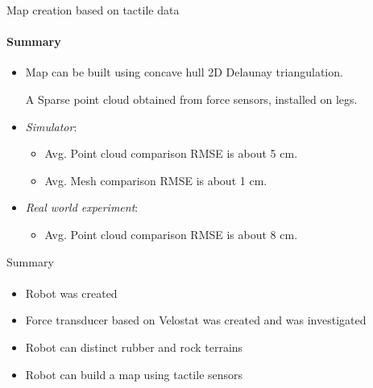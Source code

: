 \documentclass[aspectratio=169]{beamer}
\newcommand{\fbckg}[1]{\usebackgroundtemplate{\texttt{[image: \#1]}}}%
\begin{document}
\begin{frame}[t]{Map creation based on tactile data}
    \framesubtitle{Summary}
    \Large
    \begin{itemize}
        \item Map can be built using concave hull 2D Delaunay triangulation.

              A Sparse point cloud obtained from force sensors, installed on legs.
        \item \textit{Simulator}: \begin{itemize}
                  \item Avg. Point cloud comparison RMSE is about 5 cm.
                  \item Avg. Mesh comparison RMSE is about 1 cm.
              \end{itemize}
        \item \textit{Real world experiment}: \begin{itemize}
                  \item Avg. Point cloud comparison RMSE is about 8 cm.
              \end{itemize}
    \end{itemize}
\end{frame}

\begin{frame}[t]{Summary}
    \framesubtitle{}
    \Large
    \begin{itemize}
        \item Robot was created
        \item Force transducer based on Velostat was created and was investigated
        \item Robot can distinct rubber and rock terrains
        \item Robot can build a map using tactile sensors
    \end{itemize}
\end{frame}

\end{document}
